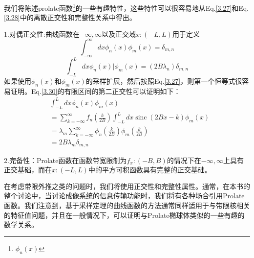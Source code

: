 \documentclass[10pt, UTF8]{ctexart}%
\numberwithin{equation}{section}
\numberwithin{figure}{section}
\newcommand{\InsertEqution}[2]{\begin{equation}
  \label{#1}
   #2
 \end{equation}}
\newcommand{\RefEq}[1]{Eq.\ref{#1}}
\newcommand{\InsertInlineEq}[1]{$#1$}
\begin{document}
\begin{sloppypar}
我们将陈述prolate函数\footnote{\InsertInlineEq{\phi_n(x)}}的一些有趣特性，这些特性可以很容易地从\RefEq{3.27}和\RefEq{3.28}中的离散正交性和完整性关系中得出。

1.对偶正交性:曲线函数在\InsertInlineEq{-\infty,\infty}以及正交域\InsertInlineEq{x:(-L,L)}用于定义\InsertEqution{3.29}{\int_{-\infty}^{\infty} d x \phi_{n}(x) \phi_{m}(x)=\delta_{m, n}}
\InsertEqution{3.30}{\int_{-L}^{L}d x \phi_{n}(x) | \phi_{m}(x)=\left(2 B \lambda_{n}\right) \delta_{m, n}}
如果使用\InsertInlineEq{\phi_n(x)}和\InsertInlineEq{\phi_m(x)}的采样扩展，然后按照\RefEq{3.27}，则第一个恒等式很容易证明。\RefEq{3.30}的有限区间的第二正交性可以证明如下：\InsertEqution{3.31}{\begin{aligned}
  &\int_{-L}^{L} d x \phi_{n}(x) \phi_{m}(x) \\
  &=\sum\limits_{k=-\infty}^{\infty} f_{n}\left(\frac{k}{2 B}\right) \int_{-L}^{L} d x \operatorname{sinc}(2 B x-k) \phi_{m}(x) \\
  &=\lambda_{m} \sum\limits_{k=-\infty}^{\infty} \phi_{n}\left(\frac{k}{2 B}\right) \phi_{m}\left(\frac{k}{2 B}\right) \\
 & =2 B \lambda_{m} \delta_{m, n}
  \end{aligned}}

  2.完备性：Prolate函数在函数带宽限制为\InsertInlineEq{f_x:(-B,B)}的情况下在\InsertInlineEq{-\infty,\infty}上具有正交基础，而在\InsertInlineEq{x:(-L,L)}中的平方可积函数具有完整的正交基础。

  在考虑带限外推之类的问题时，我们将使用正交性和完整性属性。通常，在本书的整个讨论中，当讨论成像系统的信息传输功能时，我们将有各种场合引用Prolate函数。我们注意到，基于采样定理的曲线函数的方法通常同样适用于与带限核相关的特征值问题，并且在一般情况下，可以证明与Prolate椭球体类似的一些有趣的数学关系。

\end{sloppypar}
\end{document}
